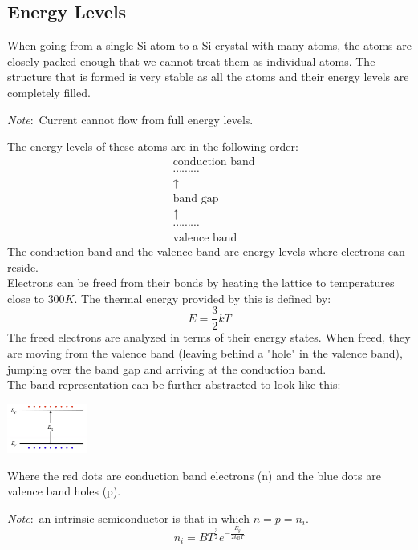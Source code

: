 \documentclass[nobib]{tufte-handout}
\newcommand{\note}[1]{
        \begin{notebox}
        \noindent\textit{Note}:\ #1
        \end{notebox}
}
\begin{document}
\subsection{Energy Levels}
When going from a single Si atom to a Si crystal with many atoms, the atoms are
closely packed enough that we cannot treat them as individual atoms. The
structure that is formed is very stable as all the atoms and their energy
levels are completely filled.\\ \note{Current cannot flow from full energy
    levels.} The energy levels of these atoms are in the following order:
\begin{eqnarray*}
    &\text{conduction band}\\
    &\cdots \cdots \cdots \\
    &\uparrow \\
    &\text{band gap}\\
    &\uparrow \\
    &\cdots \cdots \cdots \\
    &\text{valence band}
\end{eqnarray*}
The conduction band and the valence band are energy levels where electrons can reside.\\
Electrons can be freed from their bonds by heating the lattice to temperatures close to $300K$. The thermal energy provided by this is defined by:
\begin{equation*}
    E = \frac{3}{2}kT
\end{equation*}
The freed electrons are analyzed in terms of their energy states. When freed, they are moving from the valence band (leaving behind a "hole" in the valence band), jumping over the band gap and arriving at the conduction band.\\
The band representation can be further abstracted to look like this:
\begin{center}
    \includegraphics*[width = 100px]{images/band_diagram_abstraction.png}
\end{center}
Where the red dots are conduction band electrons (n) and the blue dots are valence band holes (p).
\note{an intrinsic semiconductor is that in which $n = p = n_i$.
    \begin{equation*}
        n_i = BT^{\frac{3}{2}}e^{-\frac{E_g}{2k_B T}}
    \end{equation*}
}
\end{document}

